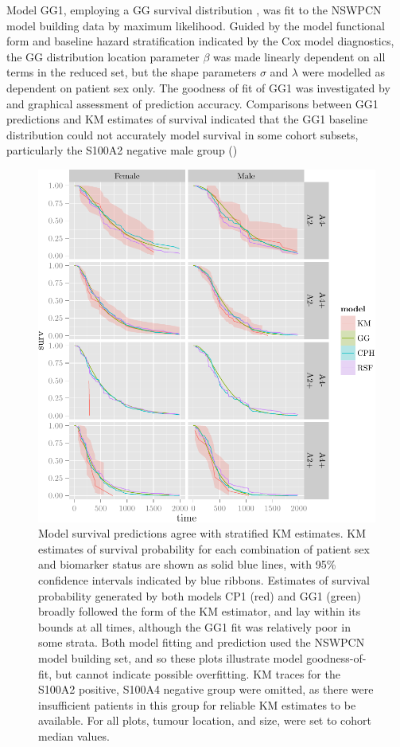 \documentclass[dissertation.tex]{subfiles}
\begin{document}
Model GG1, employing a \gls{GG} survival distribution \cite{Cox2007}, was fit to the \gls{NSWPCN} model building data by maximum likelihood.  Guided by the model functional form and baseline hazard stratification indicated by the Cox model diagnostics, the \gls{GG} distribution location parameter $\beta$ was made linearly dependent on all terms in the reduced set, but the shape parameters $\sigma$ and $\lambda$ were modelled as dependent on patient sex only.  The goodness of fit of GG1 was investigated by and graphical assessment of prediction accuracy.  Comparisons between GG1 predictions and \gls{KM} estimates of survival indicated that the GG1 baseline distribution could not accurately model survival in some cohort subsets, particularly the S100A2 negative male group ()

\begin{figure}
\centering
  \includegraphics[width=.7\linewidth]{analysis/nomogram/figure/05-final-fit-assessment-4}
  \caption[Model survival predictions agree with stratified \acrshort{KM} estimates]{Model survival predictions agree with stratified \gls{KM} estimates.  \gls{KM} estimates of survival probability for each combination of patient sex and biomarker status are shown as solid blue lines, with 95\% confidence intervals indicated by blue ribbons.  Estimates of survival probability generated by both models CP1 (red) and GG1 (green) broadly followed the form of the \gls{KM} estimator, and lay within its bounds at all times, although the GG1 fit was relatively poor in some strata.  Both model fitting and prediction used the \gls{NSWPCN} model building set, and so these plots illustrate model goodness-of-fit, but cannot indicate possible overfitting.  \gls{KM} traces for the S100A2 positive, S100A4 negative group were omitted, as there were insufficient patients in this group for reliable \gls{KM} estimates to be available.  For all plots, tumour location, and size, were set to cohort median values.}
\label{fig:nomo-cp1-gg1-fitplot}
\end{figure}
\end{document}
